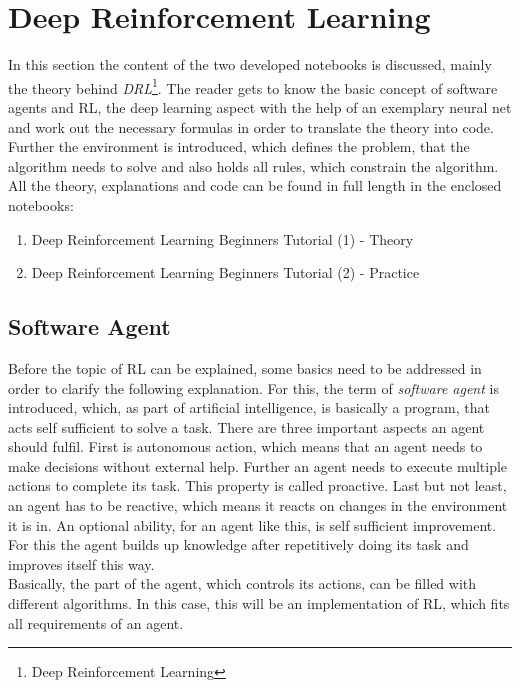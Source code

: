 \section{Deep Reinforcement Learning}
	In this section the content of the two developed notebooks is discussed, mainly the theory behind \textit{DRL}\footnote{Deep Reinforcement Learning}. The reader gets to know the basic concept of software agents and RL, the deep learning aspect with the help of an exemplary neural net and work out the necessary formulas in order to translate the theory into code. Further the environment is introduced, which defines the problem, that the algorithm needs to solve and also holds all rules, which constrain the algorithm.  All the theory, explanations and code can be found in full length in the enclosed notebooks:
	\begin{enumerate}
		\item Deep Reinforcement Learning Beginners Tutorial (1) - Theory 
		\item Deep Reinforcement Learning Beginners Tutorial (2) - Practice
	\end{enumerate}

\subsection{Software Agent}
	Before the topic of RL can be explained, some basics need to be addressed in order to clarify the following explanation.
	For this, the term of \textit{software agent} is introduced, which, as part of artificial intelligence, is basically a program, that acts self sufficient to solve a task.
	There are three important aspects an agent should fulfil. 
	First is autonomous action, which means that an agent needs to make decisions without external help.
	Further an agent needs to execute multiple actions to complete its task. 
	This property is called proactive.
	Last but not least, an agent has to be reactive, which means it reacts on changes in the environment it is in.
	An optional ability, for an agent like this, is self sufficient improvement. For this the agent builds up knowledge after repetitively doing its task and improves itself this way.\\
	Basically, the part of the agent, which controls its actions, can be filled with different algorithms. In this case, this will be an implementation of RL, which fits all requirements of an agent.

